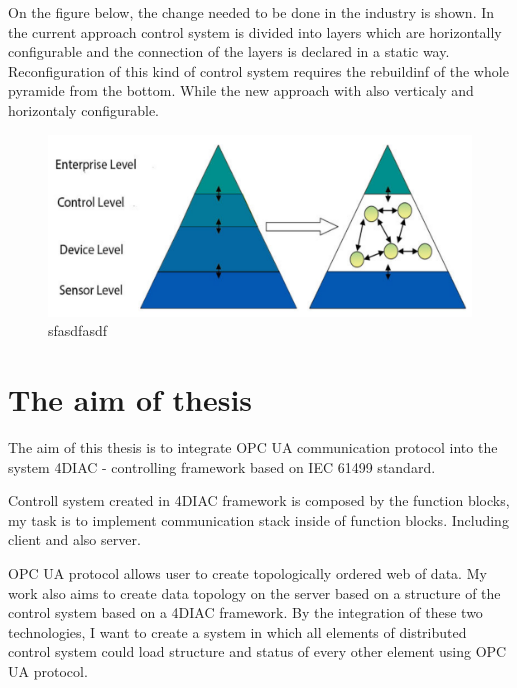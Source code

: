 On the figure below, the change needed to be done in the industry is shown. In the current approach control system is divided into layers which are horizontally configurable and the connection of the layers is declared in a static way. Reconfiguration of this kind of control system requires the rebuildinf of the whole pyramide from the bottom. While the new approach with also verticaly and horizontaly configurable. 

\begin{figure}[hbp]
\centering
\includegraphics[scale=0.5]{Figures/reconfigurationpyramide}
\decoRule
\caption[Change of industrial pyramide]{sfasdfasdf}
\label{4DIAC IDE System Perspective}
\end{figure}


\section{The aim of thesis}
The aim of this thesis is to integrate OPC UA communication protocol into the system 4DIAC - controlling framework based on IEC 61499 standard. 

Controll system created in 4DIAC framework is composed by the function blocks, my task is to implement communication stack inside of function blocks. Including client and also server. 

OPC UA protocol allows user to create topologically ordered web of data. My work also aims to create data topology on the server based on a structure of the control system based on a 4DIAC framework. By the integration of these two technologies, I want to create a system in which all elements of distributed control system could load structure and status of every other element using OPC UA protocol. 




